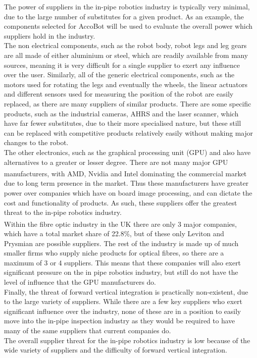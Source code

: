 \documentclass[11pt]{article}		%
\newcommand{\supercite}[1]{\textsuperscript{\cite{#1}}}		%
\begin{document}
				The power of suppliers in the in-pipe robotics industry is typically very minimal, due to the large number of substitutes for a given product.
				As an example, the components selected for AccoBot will be used to evaluate the overall power which suppliers hold in the industry.
				\\
				The non electrical components, such as the robot body, robot legs and leg gears are all made of either aluminium or steel, which are readily available from many sources, meaning it is very difficult for a single supplier to exert any influence over the user.
				Similarly, all of the generic electrical components, such as the motors used for rotating the legs and eventually the wheels, the linear actuators and different sensors used for measuring the position of the robot are easily replaced, as there are many suppliers of similar products.
				There are some specific products, such as the industrial cameras, AHRS and the laser scanner, which have far fewer substitutes, due to their more specialised nature, but these still can be replaced with competitive products relatively easily without making major changes to the robot.
				\\
				The other electronics, such as the graphical processing unit (GPU) and  also have alternatives to a greater or lesser degree.
				There are not many major GPU manufacturers, with AMD, Nvidia and Intel dominating the commercial market\supercite{rake2020graphic} due to long term presence in the market.
				Thus these manufacturers have greater power over companies which have on board image processing, and can dictate the cost and functionality of  products.
				As such, these suppliers offer the greatest threat to the in-pipe robotics industry.
				\\
				Within the fibre optic industry in the UK there are only 3 major companies\supercite{neve2020fibreoptic}, which have a total market share of 22.8\%, but of these only Leviton and Prysmian are possible suppliers.
				The rest of the industry is made up of much smaller firms who supply niche products for optical fibres, so there are a maximum of 3 or 4 suppliers.
				This means that these companies will also exert significant pressure on the in pipe robotics industry, but still do not have the level of influence that the GPU manufacturers do.
				\\
				Finally, the threat of forward vertical integration is practically non-existent, due to the large variety of suppliers.
				While there are a few key suppliers who exert significant influence over the industry, none of these are in a position to easily move into the in-pipe inspection industry as they would be required to have many of the same suppliers that current companies do.
				\\
				The overall supplier threat for the in-pipe robotics industry is low because of the wide variety of suppliers and the difficulty of forward vertical integration.
						
\end{document}
